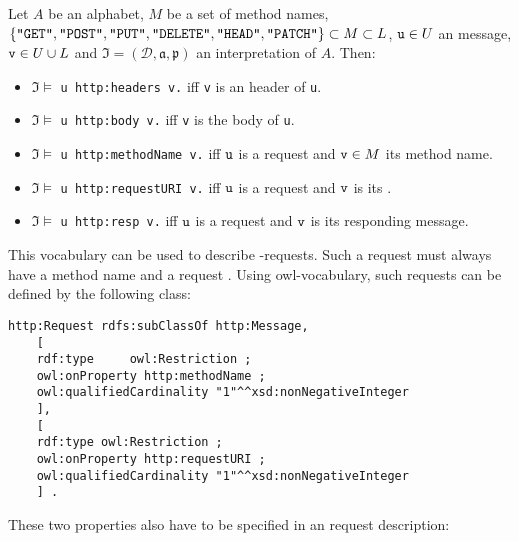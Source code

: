 \begin{definition}
Let $A$ be an \nthree alphabet,
$M$ be a set of \http method names,
$\{ \texttt{"GET"},\texttt{"POST"},\texttt{"PUT"},\linebreak[1]
\texttt{"DELETE"},\texttt{"HEAD"},\texttt{"PATCH"}\}\subset M \subset L$,
$\verb!u!\in U$ an \http message,
$\verb!v!\in U\cup L$
and $\mathfrak{I}=(\mathcal{D},\mathfrak{a,p})$ an interpretation of $A$.
Then:


\begin{itemize}
 \item  $\mathfrak{I}\models$ \verb!u http:headers v.! iff \texttt{v} is an \http header of \verb!u!.
 \item $\mathfrak{I}\models$ \verb!u http:body v.! iff \verb!v! is the \http body of \verb!u!. 
  \item $\mathfrak{I}\models$ \verb!u http:methodName v.! iff $\verb!u!$ is a request and 
  $\verb!v!\in M$ its method name.
  \item $\mathfrak{I}\models$ \verb!u http:requestURI v.! iff $\verb!u!$ is a request and $\verb!v!$ is its \URL.
  \item $\mathfrak{I}\models$ \verb!u http:resp v.! iff $\verb!u!$ is a request and $\verb!v!$ is its responding \http message.
\end{itemize}
\end{definition}

%  

This vocabulary can be used to describe \http-requests.  Such a request must always have a method name and a request \uri.
Using owl-vocabulary, such requests can be defined by the following class:
\begin{verbatim}
http:Request rdfs:subClassOf http:Message, 
    [
    rdf:type     owl:Restriction ;
    owl:onProperty http:methodName ;
    owl:qualifiedCardinality "1"^^xsd:nonNegativeInteger
    ],
    [ 
    rdf:type owl:Restriction ;
    owl:onProperty http:requestURI ;
    owl:qualifiedCardinality "1"^^xsd:nonNegativeInteger
    ] .
\end{verbatim}
These two properties also have to be specified in an \http request description:

